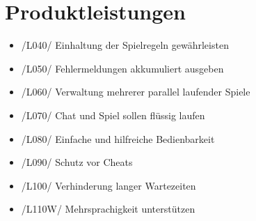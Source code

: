 \documentclass{article}
\begin{document}
\section{Produktleistungen}
\begin{itemize}
	\item /L040/ Einhaltung der Spielregeln gewährleisten
	\item /L050/ Fehlermeldungen \gls{akkumuliert} ausgeben
	\item /L060/ Verwaltung mehrerer parallel laufender Spiele
	\item /L070/ Chat und Spiel sollen flüssig laufen
	\item /L080/ Einfache und hilfreiche Bedienbarkeit
	\item /L090/ Schutz vor Cheats
	\item /L100/ Verhinderung langer Wartezeiten
	\item /L110W/ Mehrsprachigkeit unterstützen
\end{itemize}
\end{document}
